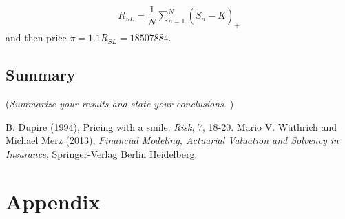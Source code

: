 \documentclass[11pt]{article}
\begin{document}
\begin{align} \label{eqsl1}
	R_{SL} = \dfrac{1}{N}\sum_{n=1}^N\left(	 \tilde{S}_n-K\right)_+        
\end{align}
and then price $\pi = 1.1R_{SL} = 18507884$.

\subsection*{Summary}
({\it Summarize your results and state your conclusions. })



\begin{thebibliography}{99}
B. Dupire (1994),
Pricing with a smile.
\emph{Risk}, 7, 18-20.
  Mario V. W\"{u}thrich and Michael Merz (2013),
  \emph{Financial Modeling, Actuarial Valuation and Solvency in Insurance},
  Springer-Verlag Berlin Heidelberg.
\end{thebibliography}


\section*{Appendix}
\end{document}
